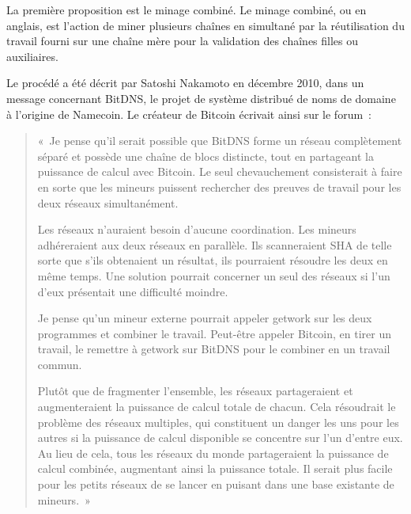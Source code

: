 
La première proposition est le minage combiné. Le minage combiné, ou  en anglais, est l'action de miner plusieurs chaînes en simultané par la réutilisation du travail fourni sur une chaîne mère pour la validation des chaînes filles ou auxiliaires.

Le procédé a été décrit par Satoshi Nakamoto en décembre 2010, dans un message concernant BitDNS, le projet de système distribué de noms de domaine à l'origine de Namecoin. Le créateur de Bitcoin écrivait ainsi sur le forum~:

\begin{quote}
«~Je pense qu'il serait possible que BitDNS forme un réseau complètement séparé et possède une chaîne de blocs distincte, tout en partageant la puissance de calcul avec Bitcoin. Le seul chevauchement consisterait à faire en sorte que les mineurs puissent rechercher des preuves de travail pour les deux réseaux simultanément.

Les réseaux n'auraient besoin d'aucune coordination. Les mineurs adhéreraient aux deux réseaux en parallèle. Ils scanneraient SHA de telle sorte que s'ils obtenaient un résultat, ils pourraient résoudre les deux en même temps. Une solution pourrait concerner un seul des réseaux si l'un d'eux présentait une difficulté moindre.

Je pense qu'un mineur externe pourrait appeler getwork sur les deux programmes et combiner le travail. Peut-être appeler Bitcoin, en tirer un travail, le remettre à getwork sur BitDNS pour le combiner en un travail commun.

Plutôt que de fragmenter l'ensemble, les réseaux partageraient et augmenteraient la puissance de calcul totale de chacun. Cela résoudrait le problème des réseaux multiples, qui constituent un danger les uns pour les autres si la puissance de calcul disponible se concentre sur l'un d'entre eux. Au lieu de cela, tous les réseaux du monde partageraient la puissance de calcul combinée, augmentant ainsi la puissance totale. Il serait plus facile pour les petits réseaux de se lancer en puisant dans une base existante de mineurs.~»
\end{quote}

